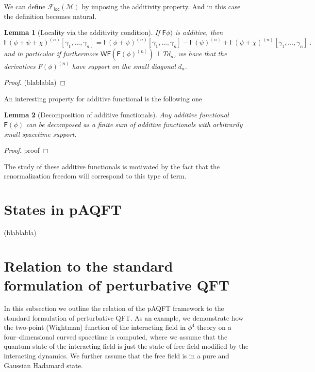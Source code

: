 \documentclass[10pt]{book}
\newcommand{\WF}{\mathsf{WF}}
\newcommand{\Fcal}{\mathcal{F}}
\newcommand{\Mcal}{\mathcal{M}}
\newcommand{\Fsf}{\mathsf{F}}
\theoremstyle{break}
\newtheorem{lemma}{Lemma}
\begin{document}
%
We can define $\Fcal_{\mathsf{loc}}(\Mcal)$ by imposing the additivity property. And in this case the definition %
becomes natural.
%
%
%
%
\begin{lemma}[Locality via the additivity condition]
If $\Fsf\phi)$ is additive, then
\begin{equation*}
\Fsf(\phi + \psi + \chi)^{(n)}[\gamma_1,...,\gamma_n] = \Fsf(\phi + \psi)^{(n)}[\gamma_1,...,\gamma_n] - \Fsf(\psi)^{(n)} + \Fsf(\psi + \chi)^{(n)}[\gamma_1,...,\gamma_n] \ . 
\end{equation*}
and in particular if furthermore $\WF\left(\Fsf(\phi)^{(n)}\right) \perp Td_n$, we have that the derivatives $F(\phi)^{(n)}$ have support on the small diagonal $d_n$. 
\end{lemma}
%
\begin{proof}
(blablabla)
\end{proof}

%
An interesting property for additive functional is the following one %
%
\begin{lemma}[Decomposition of additive functionals]
Any additive functional $\Fsf(\phi)$ can be decomposed as a finite sum of additive functionals with arbitrarily small spacetime support.
\end{lemma}
%
\begin{proof}
proof
\end{proof}
%
The study of these additive functionals is motivated by the fact that the renormalization freedom will correspond to this type of term.



\section{States in pAQFT}


(blablabla)



\section{Relation to the standard formulation of perturbative QFT}


In this subsection we outline the relation of the pAQFT framework to the standard formulation of perturbative QFT. As an example, we demonstrate how the two-point (Wightman) function of the interacting field in $\phi^4$ theory on a four--dimensional curved spacetime is computed, where we assume that the quantum state of the interacting field is just the state of free field modified by the interacting dynamics. We further assume that the free field is in a pure and Gaussian Hadamard state. 
\end{document}

